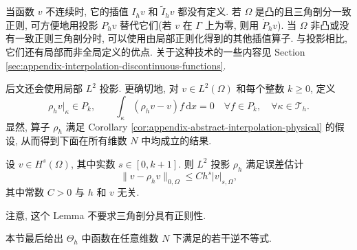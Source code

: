 \setcounter{statement}{1}
\begin{Remark}\label{rem:appendix-discontinuous-function-projections}
当函数 $v$ 不连续时, 它的插值 $I_hv$ 和 $\widetilde I_hv$ 都没有定义.
若 $\Omega$ 是凸的且三角剖分一致正则, 可方便地用投影 $P_hv$
替代它们(若 $v$ 在 $\Gamma$ 上为零, 则用 $\dot P_hv$).
当 $\Omega$ 非凸或没有一致正则三角剖分时,
可以使用由局部正则化得到的其他插值算子.
与投影相比, 它们还有局部而非全局定义的优点.
关于这种技术的一些内容见 Section
\ref{sec:appendix-interpolation-discontinuous-functions}.
\end{Remark}

后文还会使用局部 $L^2$ 投影. 更确切地, 对
$v\in L^2(\Omega)$ 和每个整数 $k\geq0$, 定义
\begin{equation}\label{eq:appendix-local-l2-projection}
\rho_hv|_\kappa\in P_k,
\qquad
\int_\kappa(\rho_hv-v)f\,\mathrm{d}x=0
\quad
\forall f\in P_k,
\quad
\forall\kappa\in\mathcal{T}_h.
\end{equation}
显然, 算子 $\rho_h$ 满足 Corollary
\ref{cor:appendix-abstract-interpolation-physical} 的假设,
从而得到下面在所有维数 $N$ 中均成立的结果.

\setcounter{statement}{4}
\begin{Lemma}\label{lem:appendix-local-l2-projection-error}
设 $v\in H^s(\Omega)$, 其中实数 $s\in[0,k+1]$.
则 $L^2$ 投影 $\rho_h$ 满足误差估计
\begin{equation}\label{eq:appendix-local-l2-projection-error}
\|v-\rho_hv\|_{0,\Omega}
\leq
Ch^s|v|_{s,\Omega},
\end{equation}
其中常数 $C>0$ 与 $h$ 和 $v$ 无关.
\end{Lemma}
注意, 这个 Lemma 不要求三角剖分具有正则性.

本节最后给出 $\Theta_h$ 中函数在任意维数 $N$ 下满足的若干逆不等式.

